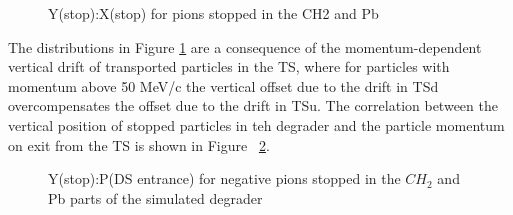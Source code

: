 \begin{figure}[H]
  \caption{
    \label{figure:y_vs_x_st}
    Y(stop):X(stop) for pions stopped in the CH2 and Pb
  }
\end{figure}

The distributions in Figure \ref{figure:y_vs_x_st} are a consequence of the momentum-dependent vertical
drift of transported particles in the TS, where for particles with momentum above 50 MeV/c the vertical offset
due to the drift in TSd overcompensates the offset due to the drift in TSu.
The correlation between the vertical position of stopped particles in teh degrader and the particle momentum
on exit from the TS is shown in Figure ~\ref{figure:y_vs_p_deg}.

\begin{figure}[H]
  \caption{
    \label{figure:y_vs_p_deg}
    Y(stop):P\@(DS entrance) for negative pions stopped in the $CH_2$ and Pb parts of the simulated degrader
  }
\end{figure}


